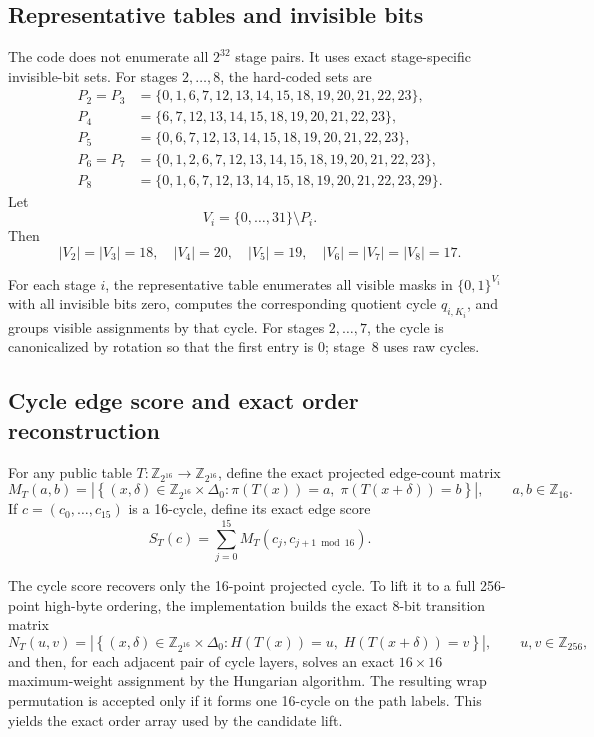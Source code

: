 \documentclass[11pt]{article}
\newcommand{\Z}[1]{\mathbb{Z}_{#1}}
\begin{document}
\subsection{Representative tables and invisible bits}
The code does not enumerate all $2^{32}$ stage pairs. It uses exact stage-specific invisible-bit sets. For stages $2,\dots,8$, the hard-coded sets are
\begin{align*}
P_2=P_3
&=\{0,1,6,7,12,13,14,15,18,19,20,21,22,23\},\\
P_4
&=\{6,7,12,13,14,15,18,19,20,21,22,23\},\\
P_5
&=\{0,6,7,12,13,14,15,18,19,20,21,22,23\},\\
P_6=P_7
&=\{0,1,2,6,7,12,13,14,15,18,19,20,21,22,23\},\\
P_8
&=\{0,1,6,7,12,13,14,15,18,19,20,21,22,23,29\}.
\end{align*}
Let
\[
V_i=\{0,\dots,31\}\setminus P_i.
\]
Then
\[
|V_2|=|V_3|=18,\quad
|V_4|=20,\quad
|V_5|=19,\quad
|V_6|=|V_7|=|V_8|=17.
\]

For each stage $i$, the representative table enumerates all visible masks in $\{0,1\}^{V_i}$ with all invisible bits zero, computes the corresponding quotient cycle $q_{i,K_i}$, and groups visible assignments by that cycle. For stages $2,\dots,7$, the cycle is canonicalized by rotation so that the first entry is $0$; stage~8 uses raw cycles.

\subsection{Cycle edge score and exact order reconstruction}
For any public table $T:\Z{2^{16}}\to\Z{2^{16}}$, define the exact projected edge-count matrix
\[
M_T(a,b)
=
\left|
\left\{
(x,\delta)\in \Z{2^{16}}\times \Delta_0:
\pi(T(x))=a,\;
\pi(T(x+\delta))=b
\right\}
\right|,
\qquad a,b\in\Z{16}.
\]
If $c=(c_0,\dots,c_{15})$ is a 16-cycle, define its exact edge score
\[
S_T(c)=\sum_{j=0}^{15} M_T(c_j,c_{j+1\bmod 16}).
\]

The cycle score recovers only the 16-point projected cycle. To lift it to a full 256-point high-byte ordering, the implementation builds the exact 8-bit transition matrix
\[
N_T(u,v)
=
\left|
\left\{
(x,\delta)\in \Z{2^{16}}\times \Delta_0:
H(T(x))=u,\;
H(T(x+\delta))=v
\right\}
\right|,
\qquad u,v\in\Z{256},
\]
and then, for each adjacent pair of cycle layers, solves an exact $16\times 16$ maximum-weight assignment by the Hungarian algorithm. The resulting wrap permutation is accepted only if it forms one 16-cycle on the path labels. This yields the exact order array used by the candidate lift.
\end{document}
